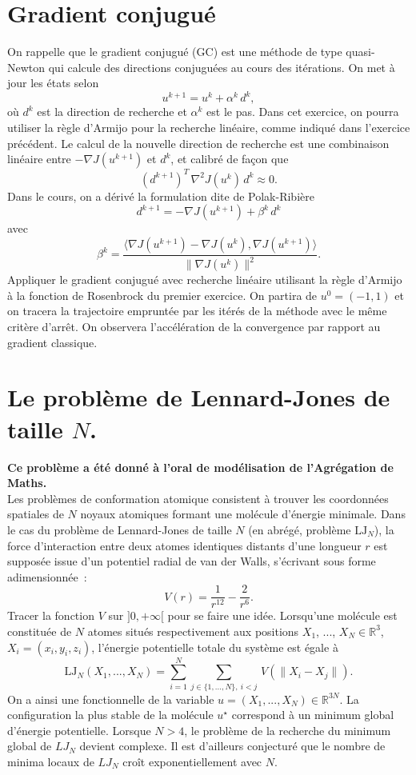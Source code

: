 \documentclass[11pt, a4paper]{amsart}
\begin{document}
\section{Gradient conjugué}
%
On rappelle que le gradient conjugué (GC) est une méthode de type quasi-Newton qui calcule des directions conjuguées au cours des itérations.
On met à jour les états selon
\[
u^{k+1} = u^k + \alpha^k \, d^k,
\]
où $d^k$ est la direction de recherche et $\alpha^k$ est le pas.
Dans cet exercice, on pourra utiliser la règle d'Armijo pour la recherche
linéaire, comme indiqué dans l'exercice précédent. Le calcul de la 
nouvelle direction de recherche est une combinaison linéaire entre 
$-\nabla J(u^{k+1})$ et $d^k$, et calibré de façon que
\[
(d^{k+1})^T\, \nabla^2 J(u^k)\, d^k \approx 0.
\]
Dans le cours, on a dérivé la formulation dite de Polak-Ribière
\[
d^{k+1} = -\nabla J(u^{k+1}) + \beta^k \, d^k
\]
avec
\[
\beta^k = 
 \frac{\langle \nabla J(u^{k+1})-\nabla J(u^k), \nabla J(u^{k+1})\rangle}
{\|\nabla J(u^k)\|^2}.
\]
Appliquer le gradient conjugué avec recherche linéaire utilisant la règle
d'Armijo à la fonction de Rosenbrock du premier exercice. On partira
de $u^0=(-1,1)$ et on tracera la trajectoire empruntée par les
itérés de la méthode avec le même critère d'arrêt. On observera
l'accélération de la convergence par rapport au gradient classique.
%
\section{Le problème de Lennard-Jones de taille $N$.} 
\textbf{Ce problème a été donné à l'oral de modélisation de l'Agrégation de Maths.}\\

Les problèmes de conformation atomique consistent à trouver les coordonnées spatiales de $N$ noyaux atomiques formant une molécule d'énergie minimale. Dans le cas du problème de 
Lennard-Jones de taille $N$ (en abrégé, problème $\mathrm{LJ}_N$), la force d'interaction entre
deux atomes identiques distants d'une longueur $r$ est supposée issue d'un potentiel radial de van der Walls, s'écrivant sous forme adimensionnée~:
\[
V(r) = \frac{1}{r^{12}} - \frac{2}{r^6}.
\]
Tracer la fonction $V$ sur $]0,+\infty[$ pour se faire une idée.
Lorsqu'une molécule est constituée de $N$ atomes situés respectivement aux positions $X_1$, ..., $X_N\in\mathbb{R}^{3}$, 
$X_i = (x_i,y_i,z_i)$, l'énergie potentielle totale du système est égale à
\[
\mathrm{LJ}_N(X_1,...,X_N) = \sum_{i=1}^N
\sum_{j\in\{1,...,N\},\ i<j}\, V\left(\|X_i-X_j\|\right).
\]
On a ainsi une fonctionnelle de la variable
$u=(X_1,...,X_N)\in \mathbb{R}^{3N}$.
La configuration la plus stable de la molécule $u^\star$ correspond à un minimum global d'énergie
potentielle. %
Lorsque $N>4$, le problème de la recherche du minimum global de $LJ_N$ devient
complexe. Il est d'ailleurs conjecturé que le nombre de minima locaux de $LJ_N$ croît exponentiellement avec $N$.
\medskip
\end{document}
